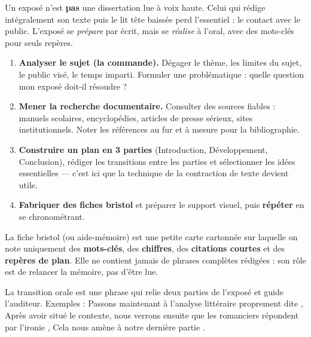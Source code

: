 \documentclass[11pt]{article}
\newcommand{\cle}[1]{{\popxbold\color{popdark}#1}}
\newcounter{popsec}
\newcounter{popsub}
\newcommand{\courssub}[1]{%
  \stepcounter{popsub}%
  \par\vspace{9pt}\noindent{\popxbold\fontsize{11.5}{13}\selectfont\color{popink}{\color{poporange}\thepopsec.\thepopsub}\hspace{6pt}#1}\par\nopagebreak\vspace{4pt}
}
\begin{document}
\begin{attention}
Un exposé n'est \textbf{pas} une dissertation lue à voix haute. Celui qui rédige intégralement son texte puis le lit tête baissée perd l'essentiel : le contact avec le public. L'exposé se \emph{prépare} par écrit, mais se \emph{réalise} à l'oral, avec des mots-clés pour seuls repères.
\end{attention}

\courssub{Les étapes de la préparation}

\begin{methode}
\begin{enumerate}
\item \textbf{Analyser le sujet (la commande).} Dégager le thème, les limites du sujet, le public visé, le temps imparti. Formuler une \cle{problématique} : quelle question mon exposé doit-il résoudre ?
\item \textbf{Mener la recherche documentaire.} Consulter des sources fiables : manuels scolaires, encyclopédies, articles de presse sérieux, sites institutionnels. Noter les références au fur et à mesure pour la bibliographie.
\item \textbf{Construire un plan en 3 parties} (Introduction, Développement, Conclusion), rédiger les \cle{transitions} entre les parties et sélectionner les idées essentielles — c'est ici que la technique de la contraction de texte devient utile.
\item \textbf{Fabriquer des fiches bristol} et préparer le support visuel, puis \textbf{répéter} en se chronométrant.
\end{enumerate}
\end{methode}

\begin{definition}
La \cle{fiche bristol} (ou aide-mémoire) est une petite carte cartonnée sur laquelle on note uniquement des \textbf{mots-clés}, des \textbf{chiffres}, des \textbf{citations courtes} et des \textbf{repères de plan}. Elle ne contient jamais de phrases complètes rédigées : son rôle est de relancer la mémoire, pas d'être lue.
\end{definition}

\begin{definition}
La \cle{transition orale} est une phrase qui relie deux parties de l'exposé et guide l'auditeur. Exemples : \og Passons maintenant à l'analyse littéraire proprement dite \fg{}, \og Après avoir situé le contexte, nous verrons ensuite que les romanciers répondent par l'ironie \fg{}, \og Cela nous amène à notre dernière partie \fg{}.
\end{definition}
\end{document}
